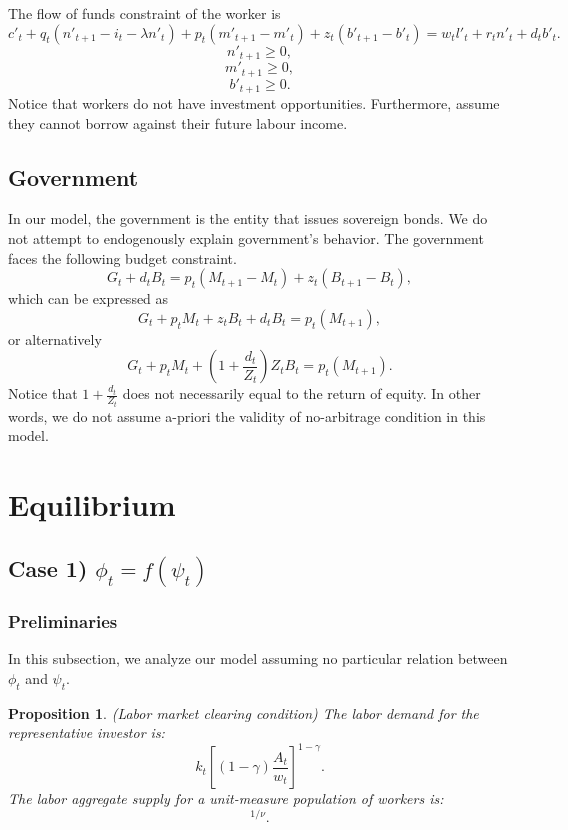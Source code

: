 \documentclass[12pt]{article}%
\newtheorem{proposition}{Proposition}
\begin{document}
The flow of funds constraint of the worker is
\begin{equation}
c'_t +q_t(n'_{t+1}-i_t-\lambda n'_t)+p_t (m'_{t+1}-m'_t)+z_t(b'_{t+1}-b'_t) = w_t l'_t + r_t
n'_t + d_t b'_t.
\end{equation}
\begin{equation}
n'_{t+1} \geq 0,
\end{equation}
\begin{equation}
m'_{t+1} \geq 0,
\end{equation}
\begin{equation}
b'_{t+1} \geq 0.
\end{equation}
Notice that workers do not have investment opportunities. Furthermore, assume
they cannot borrow against their future labour income. 

\subsection{Government}
In our model, the government is the entity that issues sovereign bonds. We do not attempt to endogenously
explain government's behavior. The government faces the following budget constraint.
\begin{equation}
G_t + d_t B_t = p_t (M_{t+1}-M_t) + z_t (B_{t+1}-B_t),
\end{equation}
which can be expressed as
\begin{equation}
G_t +p_tM_t+z_t B_t + d_t B_t = p_t (M_{t+1}),
\end{equation}
or alternatively
\begin{equation}
G_t +p_tM_t+(1+\frac{d_t}{Z_t})Z_t B_t = p_t (M_{t+1}).
\end{equation}
Notice that $1+\frac{d_t}{Z_t}$ does not necessarily equal to the return of
equity. In other words, we do not assume a-priori the validity of no-arbitrage
condition in this model.
\section{Equilibrium}
\subsection{Case 1) \not \exists $\phi_t = f(\psi_t)$}
\subsubsection{Preliminaries}
In this subsection, we analyze our model assuming no particular relation between
 $\phi_t$ and $\psi_t$.
\begin{proposition}
(Labor market clearing condition) The labor demand for the representative investor
is:
\begin{equation}
k_t [ (1-\gamma)\frac{A_t}{w_t}]^{1-\gamma}.
\end{equation}
The labor aggregate supply for a unit-measure population of workers is:
\begin{equation}
[\frac{w_t}{\omega}]^{1/\nu}.
\end{equation}
\end{proposition}
\end{document}
